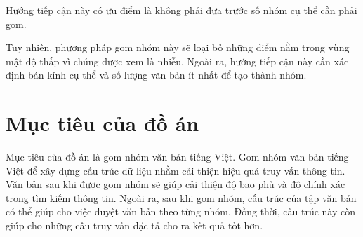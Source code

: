 Hướng tiếp cận này có ưu điểm là không phải đưa trước số nhóm cụ thể cần phải gom.

Tuy nhiên, phương pháp gom nhóm này sẽ loại bỏ những điểm nằm trong vùng mật độ thấp vì chúng được xem là nhiễu.
Ngoài ra, hướng tiếp cận này cần xác định bán kính cụ thể và số lượng văn bản ít nhất để tạo thành nhóm.
%



\section{Mục tiêu của đồ án}
\label{sec:mtcda}
Mục tiêu của đồ án là gom nhóm văn bản tiếng Việt.
Gom nhóm văn bản tiếng Việt để xây dựng cấu trúc dữ liệu nhằm cải thiện hiệu quả truy vấn thông tin.
Văn bản sau khi được gom nhóm sẽ giúp cải thiện độ bao phủ và độ chính xác trong tìm kiếm thông tin.
Ngoài ra, sau khi gom nhóm, cấu trúc của tập văn bản có thể giúp cho việc duyệt văn bản theo từng nhóm.
Đồng thời, cấu trúc này còn giúp cho những câu truy vấn đặc tả cho ra kết quả tốt hơn.

